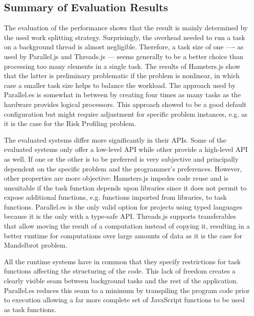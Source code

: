 \subsection{Summary of Evaluation Results}
The evaluation of the performance shows that the result is mainly determined by the used work splitting strategy. Surprisingly, the overhead needed to run a task on a background thread is almost negligible. Therefore, a task size of one ---- as used by Parallel.js and Threads.js --- seems generally to be a better choice than processing too many elements in a single task. The results of Hamsters.js show that the latter is preliminary problematic if the problem is nonlinear, in which case a smaller task size helps to balance the workload. The approach used by Parallel.es is somewhat in between by creating four times as many tasks as the hardware provides logical processors. This approach showed to be a good default configuration but might require adjustment for specific problem instances, e.g. as it is the case for the Risk Profiling problem.

The evaluated systems differ more significantly in their APIs. Some of the evaluated systems only offer a low-level API while other provide a high-level API as well. If one or the other is to be preferred is very subjective and principally dependent on the specific problem and the programmer's preferences. However, other properties are more objective: Hamsters.js impedes code reuse and is unsuitable if the task function depends upon libraries since it does not permit to expose additional functions, e.g. functions imported from libraries, to task functions. Parallel.es is the only valid option for projects using typed languages because it is the only with a type-safe API. Threads.js supports transferables that allow moving the result of a computation instead of copying it, resulting in a better runtime for computations over large amounts of data as it is the case for Mandelbrot problem.


All the runtime systems have in common that they specify restrictions for task functions affecting the structuring of the code. This lack of freedom creates a clearly visible seam between background tasks and the rest of the application. Parallel.es reduces this seam to a minimum by transpiling the program code prior to execution allowing a far more complete set of JavaScript functions to be used as task functions.
